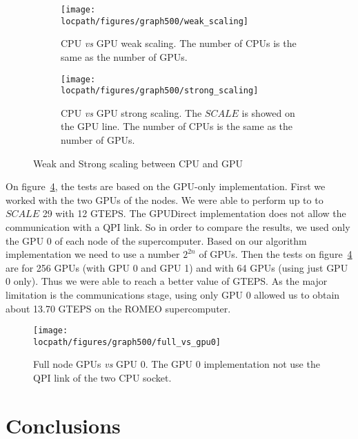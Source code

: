\begin{figure}[htb]
\begin{subfigure}[t]{0.48\linewidth}
\centering
\texttt{[image: \\locpath/figures/graph500/weak\_scaling]}
\caption[]{CPU \textit{vs} GPU weak scaling. The number of CPUs is the same as the number of GPUs.}
\label{fig:bfs_weak_scaling}
\end{subfigure}
\hfill
\begin{subfigure}[t]{0.48\linewidth}
\centering
\texttt{[image: \\locpath/figures/graph500/strong\_scaling]}
\caption[]{CPU \textit{vs} GPU strong scaling. The $SCALE$ is showed on the GPU line. The number of CPUs is the same as the number of GPUs.}
\label{fig:bfs_strong_scaling}
\end{subfigure}
\caption{Weak and Strong scaling between CPU and GPU}
\end{figure}


On figure~\ref{fig:full_vs_gpu0}, the tests are based on the GPU-only implementation. 
First we worked with the two GPUs of the nodes. 
We were able to perform up to to $SCALE$ 29 with 12 GTEPS. 
The GPUDirect implementation does not allow the communication with a QPI link. 
So in order to compare the results, we used only the GPU 0 of each node of the supercomputer. 
Based on our algorithm implementation we need to use a number $2^{2n}$ of GPUs. 
Then the tests on figure~\ref{fig:full_vs_gpu0} are for 256 GPUs (with GPU 0 and GPU 1) and with 64 GPUs (using just GPU 0 only). 
Thus we were able to reach a better value of GTEPS. 
As the major limitation is the communications stage, using only GPU 0 allowed us to obtain about 13.70 GTEPS on the ROMEO supercomputer. 

\begin{figure}[!t]
\centering
\texttt{[image: \\locpath/figures/graph500/full\_vs\_gpu0]}
\caption[]{Full node GPUs \textit{vs} GPU 0. The GPU 0 implementation not use the QPI link of the two CPU socket.}
\label{fig:full_vs_gpu0}
\end{figure}

\section{Conclusions}

